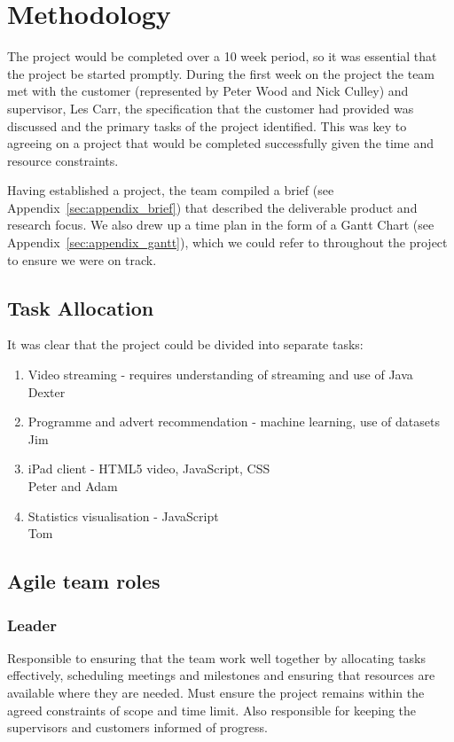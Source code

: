 \section{Methodology}

The project would be completed over a 10 week period, so it was essential that the project be started promptly. During the first week on the project the team met with the customer (represented by Peter Wood and Nick Culley) and supervisor, Les Carr, the specification that the customer had provided was discussed and the primary tasks of the project identified. This was key to agreeing on a project that would be completed successfully given the time and resource constraints.

Having established a project, the team compiled a brief (see Appendix~\ref{sec:appendix_brief}) that described the deliverable product and research focus. We also drew up a time plan in the form of a Gantt Chart (see Appendix~\ref{sec:appendix_gantt}), which we could refer to throughout the project to ensure we were on track.

\subsection{Task Allocation}
It was clear that the project could be divided into separate tasks:
\begin{enumerate}
\item Video streaming - requires understanding of streaming and use of Java\\
		Dexter
\item Programme and advert recommendation - machine learning, use of datasets\\
		Jim
\item iPad client - HTML5 video, JavaScript, CSS\\
		Peter and Adam
\item Statistics visualisation - JavaScript\\
		Tom
\end{enumerate}

\subsection{Agile team roles}
\subsubsection{Leader}
Responsible to ensuring that the team work well together by allocating tasks effectively, scheduling meetings and milestones and ensuring that resources are available where they are needed. Must ensure the project remains within the agreed constraints of scope and time limit. Also responsible for keeping the supervisors and customers informed of progress.

